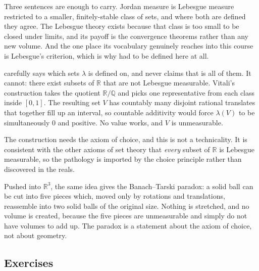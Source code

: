\begin{remark}
\label{rem:lebesgue_digression_summary}
Three sentences are enough to carry. Jordan measure is Lebesgue measure restricted to a smaller,
finitely-stable class of sets, and where both are defined they agree. The Lebesgue theory exists
because that class is too small to be closed under limits, and its payoff is the convergence
theorems rather than any new volume. And the one place its vocabulary genuinely reaches into this
course is Lebesgue's criterion, which is why  had to be defined here at all.
\end{remark}

\begin{aside}
\label{aside:vitali_banach_tarski}
 carefully says which sets $\lambda$ is defined on, and never
claims that is all of them. It cannot: there exist subsets of $\mathbb{R}$ that are not Lebesgue
measurable. Vitali's construction takes the quotient $\mathbb{R}/\mathbb{Q}$ and picks one
representative from each class inside $[0,1]$. The resulting set $V$ has countably many disjoint
rational translates that together fill up an interval, so countable additivity would force
$\lambda(V)$ to be simultaneously $0$ and positive. No value works, and $V$ is unmeasurable.

The construction needs the axiom of choice, and this is not a technicality. It is consistent with
the other axioms of set theory that \emph{every} subset of $\mathbb{R}$ is Lebesgue measurable, so
the pathology is imported by the choice principle rather than discovered in the reals.

Pushed into $\mathbb{R}^3$, the same idea gives the Banach--Tarski paradox: a solid ball can be cut
into five pieces which, moved only by rotations and translations, reassemble into two solid balls
of the original size. Nothing is stretched, and no volume is created, because the five pieces are
unmeasurable and simply do not have volumes to add up. The paradox is a statement about the axiom
of choice, not about geometry.
\end{aside}

\subsection{Exercises}

